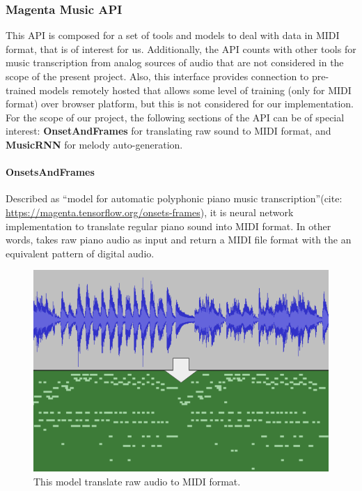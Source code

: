 \subsubsection{Magenta Music API}

This API is composed for a set of tools and models to deal with data in MIDI format, that
is of interest for us. Additionally, the API counts with other tools for music
transcription from analog sources of audio that are not considered in the scope of the
present project. Also, this interface provides connection to pre-trained models remotely
hosted that allows some level of training (only for MIDI format) over browser platform,
but this is not considered for our implementation. For the scope of our project, the
following sections of the API can be of special interest: \textbf{OnsetAndFrames} for
translating raw sound to MIDI format, and \textbf{MusicRNN} for melody auto-generation.

\paragraph{OnsetsAndFrames} Described as “model for automatic polyphonic piano music
transcription”(cite: \url{https://magenta.tensorflow.org/onsets-frames}), it is neural
network implementation to translate regular piano sound into MIDI format. In other words,
takes raw piano audio as input and return a MIDI file format with the an equivalent
pattern of digital audio.

\begin{figure}[h!]
  \centering
  \includegraphics[width=\linewidth]{image/fig_JDF02.png}
  \caption{This model translate raw audio to MIDI format.}
\end{figure}

